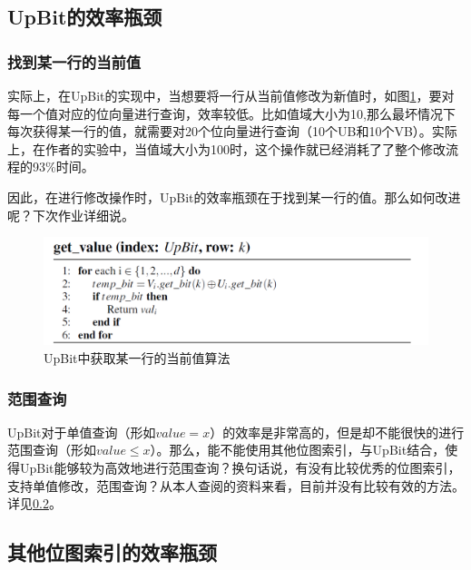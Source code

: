 \documentclass[11pt, a4paper]{article}
\begin{document}
  \subsection{UpBit的效率瓶颈}

  \subsubsection{找到某一行的当前值}

  实际上，在UpBit的实现中，当想要将一行从当前值修改为新值时，如图\ref{fig:get_value}，要对每一个值对应的位向量进行查询，效率较低。比如值域大小为10,那么最坏情况下每次获得某一行的值，就需要对20个位向量进行查询（10个UB和10个VB）。实际上，在作者的实验中，当值域大小为100时，这个操作就已经消耗了了整个修改流程的93\%时间。

  因此，在进行修改操作时，UpBit的效率瓶颈在于找到某一行的值。那么如何改进呢？下次作业详细说。

  \begin{figure}[H]
    \begin{center}
      \includegraphics[width=5.5in]{get_value.png}
      \caption{UpBit中获取某一行的当前值算法}\label{fig:get_value}
    \end{center}
  \end{figure}

  \subsubsection{范围查询}

  UpBit对于单值查询（形如$value = x$）的效率是非常高的，但是却不能很快的进行范围查询（形如$value \leq x$）。那么，能不能使用其他位图索引，与UpBit结合，使得UpBit能够较为高效地进行范围查询？换句话说，有没有比较优秀的位图索引，支持单值修改，范围查询？从本人查阅的资料来看，目前并没有比较有效的方法。详见\ref{section:other_bitmaps}。

  \subsection{其他位图索引的效率瓶颈} \label{section:other_bitmaps}
\end{document}
